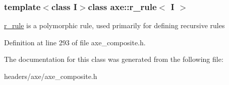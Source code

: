 \subsubsection*{template$<$class I$>$class axe\+::r\+\_\+rule$<$ I $>$}

\hyperlink{classaxe_1_1r__rule}{r\+\_\+rule} is a polymorphic rule, used primarily for defining recursive rules 

Definition at line 293 of file axe\+\_\+composite.\+h.



The documentation for this class was generated from the following file\+:\begin{DoxyCompactItemize}
\item 
headers/axe/axe\+\_\+composite.\+h\end{DoxyCompactItemize}
